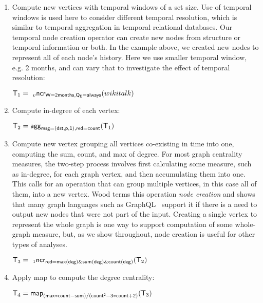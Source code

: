 \begin{enumerate}[noitemsep,,itemindent=\dimexpr\labelwidth+\labelsep\relax,leftmargin=0pt]
\item Compute new vertices with temporal windows of a set size.  Use
  of temporal windows is used here to consider different temporal
  resolution, which is similar to temporal aggregation in temporal
  relational databases.  Our temporal node creation operator can
  create new nodes from structure or temporal information or both.  In
  the example above, we created new nodes to represent all of each
  node's history.  Here we use smaller temporal window, e.g. 2 months,
  and can vary that to investigate the effect of temporal resolution:

\begin{center}
\vspace{-0.2cm}
$\mathsf{T}_1 = ~_{v}\textsf{ncr}_{\mathsf{W=2 months,Q_E=always}}(wikitalk)$
\vspace{-0.2cm}
\end{center}

\item Compute in-degree of each vertex:

\begin{center}
\vspace{-0.2cm}
$\mathsf{T}_2 = \textsf{agg}_{\mathsf{msg=(dst,p,1),red=count}}(\mathsf{T}_1)$
\vspace{-0.2cm}
\end{center}

\item Compute new vertex grouping all vertices co-existing in time
  into one, computing the sum, count, and max of degree.  For most
  graph centrality measures, the two-step process involves first
  calculating some measure, such as in-degree, for each graph vertex,
  and then accumulating them into one.  This calls for an operation
  that can group multiple vertices, in this case all of them, into a
  new vertex.  Wood terms this operation {\em node creation} and shows
  that many graph languages such as GraphQL~\cite{He2008} support it
  if there is a need to output new nodes that were not part of the
  input.  Creating a single vertex to represent the whole graph is one
  way to support computation of some whole-graph measure, but, as we
  show throughout, node creation is useful for other types of
  analyses.  

\begin{center}
\vspace{-0.2cm}
$\mathsf{T}_3 = ~_{1}\textsf{ncr}_{\mathsf{red=max(deg)\&sum(deg)\&count(deg)}}(\mathsf{T}_2)$
\vspace{-0.2cm}
\end{center}

\item Apply map to compute the degree centrality:

\begin{center}
\vspace{-0.2cm}
$\mathsf{T}_4 = \textsf{map}_{\mathsf{(max*count-sum)/(count^2-3*count+2)}}(\mathsf{T}_3)$
\vspace{-0.2cm}
\end{center}

\end{enumerate}

